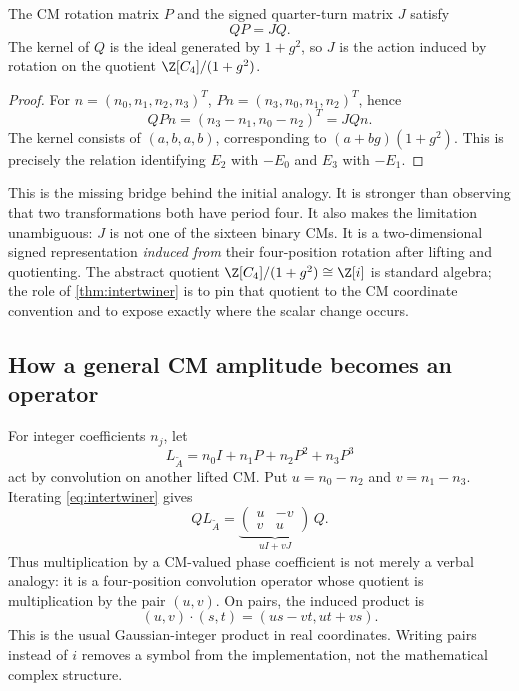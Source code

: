 \begin{theorem}\label{thm:intertwiner}
The CM rotation matrix $P$ and the signed quarter-turn matrix $J$ satisfy
\begin{equation}\label{eq:intertwiner}
 QP=JQ.
\end{equation}
The kernel of $Q$ is the ideal generated by $1+g^2$, so $J$ is the action induced by rotation on the quotient $\Z[C_4]/(1+g^2)$.
\end{theorem}
\begin{proof}
For $n=(n_0,n_1,n_2,n_3)^T$, $Pn=(n_3,n_0,n_1,n_2)^T$, hence
\begin{equation}
 QPn=(n_3-n_1,n_0-n_2)^T=JQn.
\end{equation}
The kernel consists of $(a,b,a,b)$, corresponding to $(a+bg)(1+g^2)$. This is precisely the relation identifying $E_2$ with $-E_0$ and $E_3$ with $-E_1$.
\end{proof}
This is the missing bridge behind the initial analogy. It is stronger than observing that two transformations both have period four. It also makes the limitation unambiguous: $J$ is not one of the sixteen binary CMs. It is a two-dimensional signed representation \emph{induced from} their four-position rotation after lifting and quotienting.  The abstract quotient $\Z[C_4]/(1+g^2)\cong\Z[i]$ is standard algebra; the role of \cref{thm:intertwiner} is to pin that quotient to the CM coordinate convention and to expose exactly where the scalar change occurs.

\subsection{How a general CM amplitude becomes an operator}
For integer coefficients $n_j$, let
\begin{equation}
 L_{\widetilde A}=n_0I+n_1P+n_2P^2+n_3P^3
\end{equation}
act by convolution on another lifted CM. Put $u=n_0-n_2$ and $v=n_1-n_3$. Iterating \cref{eq:intertwiner} gives
\begin{equation}\label{eq:operatorbridge}
 QL_{\widetilde A}=
 \underbrace{\begin{pmatrix}u&-v\\v&u\end{pmatrix}}_{uI+vJ}\,Q.
\end{equation}
Thus multiplication by a CM-valued phase coefficient is not merely a verbal analogy: it is a four-position convolution operator whose quotient is multiplication by the pair $(u,v)$. On pairs, the induced product is
\begin{equation}
 (u,v)\cdot(s,t)=(us-vt,ut+vs).
\end{equation}
This is the usual Gaussian-integer product in real coordinates. Writing pairs instead of $i$ removes a symbol from the implementation, not the mathematical complex structure.

